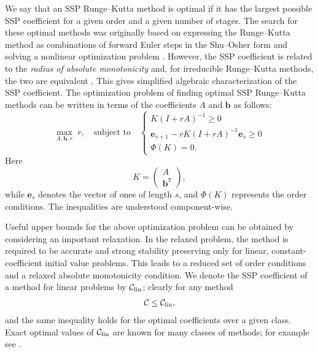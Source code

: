 We say that an SSP Runge--Kutta method is optimal if it has the largest 
possible SSP coefficient for a given order and a given number of stages.
The search for these optimal methods was originally based on
expressing the Runge--Kutta method as combinations of forward Euler
steps in the Shu--Osher form and solving a nonlinear optimization
problem \cite{Gottlieb/Shu:1998, Gottlieb2001, Spiteri2003a, Spiteri2003b,
  Ruuth2004, Ruuth:2006}.
However, the SSP coefficient is related to the 
\emph{radius of absolute monotonicity} \cite{Kraaijevanger1991} and, 
for irreducible Runge--Kutta methods, the two are equivalent 
\cite{Ferracina2004, Higueras2004}.
This gives  simplified algebraic characterization of the SSP coefficient. 
\cite{Ferracina2005}
The optimization problem of finding optimal SSP Runge--Kutta methods
can be written in terms of the coefficients $A$ and $\bm{b}$ as
follows:
\begin{equation}\label{eq:SSP_opt}
    \max_{A, \bm{b}, r} \; r, \quad \text{subject to} \quad \left\{
                                                 \begin{array}{ll}
                                                   K(I + rA)^{-1} \geq 0 \\
                                                   \bm{e}_{s+1} - rK(I + rA)^{-1}\bm{e}_{s} \geq 0 \\
                                                   \Phi(K) = 0.
                                                 \end{array}
                                               \right.
\end{equation}
Here
\begin{equation*}
    K = \left(
            \begin{array}{c}
                     A              \\
                     \bm{b}^{\texttt{T}}
            \end{array}
         \right),
\end{equation*}
while $\bm{e}_s$ denotes the vector of ones of length $s$,
and \( \Phi(K) \) represents the  order conditions.
The inequalities are understood component-wise.

Useful upper bounds for the above optimization problem can be obtained 
by considering an important relaxation. 
In the relaxed problem, the method is required to be accurate and strong 
stability preserving only for linear, constant-coefficient initial value problems. 
This leads to a reduced set of order conditions and a relaxed absolute 
monotonicity condition.
We denote the SSP coefficient of a method for linear problems by $\mathcal{C}_{\text{lin}}$; 
clearly for any method
\begin{align*}
	\mathcal{C}\le\mathcal{C}_{\text{lin}},
\end{align*}
and the same inequality holds for the optimal coefficients over a given class.
Exact optimal values of $\mathcal{C}_{\text{lin}}$ are known for many classes of methods; for
example see \cite{Kraaijevanger1986,ketcheson2009a}.

